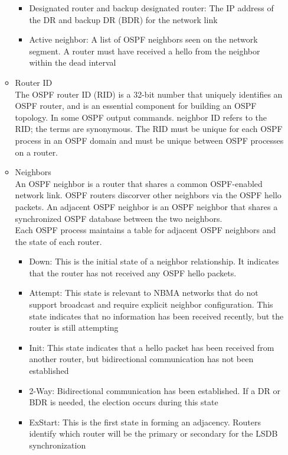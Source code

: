 \documentclass{article}
\begin{document}
\begin{itemize}
\begin{itemize}
\begin{itemize}
					\item Designated router and backup designated router:
						The IP address of the DR and backup DR (BDR) for the network link

					\item Active neighbor:
						A list of OSPF neighbors seen on the network segment. A router must have received a hello from the neighbor within the dead interval
				\end{itemize}


			\item Router ID\\
				The OSPF router ID (RID) is a 32-bit number that uniquely identifies an OSPF router, and is an essential component for building an OSPF topology. In some OSPF output commands. neighbor ID refers to the RID; the terms are synonymous. The RID must be unique for each OSPF process in an OSPF domain and must be unique between OSPF processes on a router.


			\item Neighbors\\
				An OSPF neighbor is a router that shares a common OSPF-enabled network link. OSPF routers discorver other neighbors via the OSPF hello packets. An adjacent OSPF neighbor is an OSPF neighbor that shares a synchronized OSPF database between the two neighbors.\\

				Each OSPF process maintains a table for adjacent OSPF neighbors and the state of each router.
				\begin{itemize}
					\item Down: This is the initial state of a neighbor relationship. It indicates that the router has not received any OSPF hello packets.

					\item Attempt: This state is relevant to NBMA networks that do not support broadcast and require explicit neighbor configuration. This state indicates that no information has been received recently, but the router is still attempting
					\item Init: This state indicates that a hello packet has been received from another router, but bidirectional communication has not been established

					\item 2-Way: Bidirectional communication has been established. If a DR or BDR is needed, the election occurs during this state
					\item ExStart: This is the first state in forming an adjacency. Routers identify which router will be the primary or secondary for the LSDB synchronization


\end{itemize}
\end{itemize}
\end{itemize}
\end{document}
